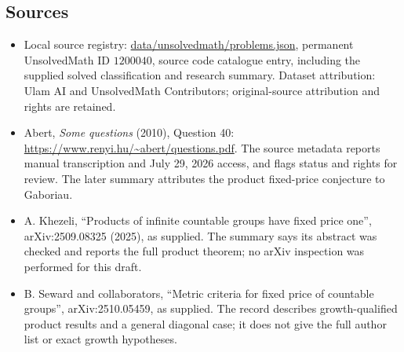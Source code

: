 \documentclass[11pt]{article}
\begin{document}
\subsection{Sources}
\begin{itemize}
\item Local source registry: \url{data/unsolvedmath/problems.json}, permanent UnsolvedMath ID $1200040$, source code catalogue entry, including the supplied solved classification and research summary. Dataset attribution: Ulam AI and UnsolvedMath Contributors; original-source attribution and rights are retained.
\item Abert, \emph{Some questions} (2010), Question 40: \url{https://www.renyi.hu/~abert/questions.pdf}. The source metadata reports manual transcription and July 29, 2026 access, and flags status and rights for review. The later summary attributes the product fixed-price conjecture to Gaboriau.
\item A. Khezeli, ``Products of infinite countable groups have fixed price one'', arXiv:2509.08325 (2025), as supplied. The summary says its abstract was checked and reports the full product theorem; no arXiv inspection was performed for this draft.
\item B. Seward and collaborators, ``Metric criteria for fixed price of countable groups'', arXiv:2510.05459, as supplied. The record describes growth-qualified product results and a general diagonal case; it does not give the full author list or exact growth hypotheses.
\end{itemize}
\end{document}
